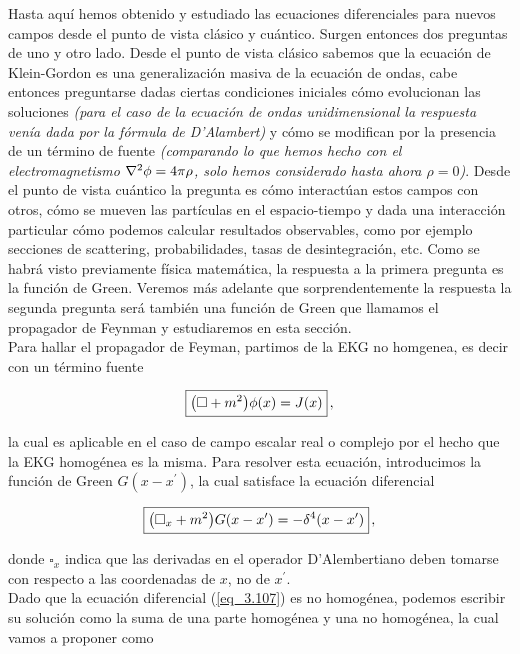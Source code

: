 Hasta aquí hemos obtenido y estudiado las ecuaciones diferenciales para nuevos campos desde el punto de vista clásico y cuántico. Surgen entonces dos preguntas de uno y otro lado. Desde el punto de vista clásico sabemos que la ecuación de Klein-Gordon es una generalización masiva de la ecuación de ondas, cabe entonces preguntarse dadas ciertas condiciones iniciales cómo evolucionan las soluciones \emph{(para el caso de la ecuación de ondas unidimensional la respuesta venía dada por la fórmula de D’Alambert)} y cómo se modifican por la presencia de un término de fuente \emph{(comparando lo que hemos hecho con el electromagnetismo $\laplacian \phi = 4\pi \rho$, solo hemos considerado hasta ahora $\rho=0$)}. Desde el punto de vista cuántico la pregunta es cómo interactúan estos campos con otros, cómo se mueven las partículas en el espacio-tiempo y dada una interacción particular cómo podemos calcular resultados observables, como por ejemplo secciones de scattering, probabilidades, tasas de desintegración, etc. Como se habrá visto previamente física matemática, la respuesta a la primera pregunta es la función de Green. Veremos más adelante que sorprendentemente la respuesta la segunda pregunta será también una función de Green que llamamos el propagador de Feynman y estudiaremos en esta sección.\\

Para hallar el propagador de Feyman, partimos de la EKG no homgenea, es decir con un término fuente

\begin{equation}
	\boxed{
    \qty(\square +m^{2} ) \phi(x) = J(x)} \, ,
    \label{eq_3.107}
\end{equation}

la cual es aplicable en el caso de campo escalar real o complejo por el hecho que la EKG homogénea es la misma. Para resolver esta ecuación, introducimos la función de Green $G(x-x^{\prime })$, la cual satisface la ecuación diferencial

\begin{equation}
	\boxed{
    \qty( \square _{x}+m^{2} ) G\qty(x-x^\prime) = - \delta^4 \qty(x-x^\prime) } \, ,
    \label{eq_3.108}
\end{equation}

donde $\square_{x}$ indica que las derivadas en el operador D'Alembertiano deben tomarse con respecto a las coordenadas de $x$, no de $x^{\prime}$.\\

Dado que la ecuación diferencial (\ref{eq_3.107}) es no homogénea, podemos escribir su solución como la suma de una parte homogénea y una no homogénea, la cual vamos a proponer como

